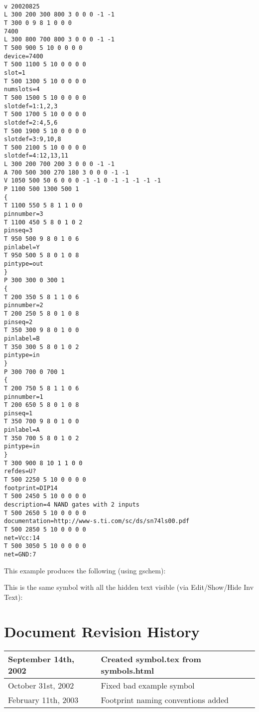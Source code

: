 \documentclass{article}
\begin{document}
\begin{verbatim}

v 20020825
L 300 200 300 800 3 0 0 0 -1 -1
T 300 0 9 8 1 0 0 0
7400
L 300 800 700 800 3 0 0 0 -1 -1
T 500 900 5 10 0 0 0 0
device=7400
T 500 1100 5 10 0 0 0 0
slot=1
T 500 1300 5 10 0 0 0 0
numslots=4
T 500 1500 5 10 0 0 0 0
slotdef=1:1,2,3
T 500 1700 5 10 0 0 0 0
slotdef=2:4,5,6
T 500 1900 5 10 0 0 0 0
slotdef=3:9,10,8
T 500 2100 5 10 0 0 0 0
slotdef=4:12,13,11
L 300 200 700 200 3 0 0 0 -1 -1
A 700 500 300 270 180 3 0 0 0 -1 -1
V 1050 500 50 6 0 0 0 -1 -1 0 -1 -1 -1 -1 -1
P 1100 500 1300 500 1
{
T 1100 550 5 8 1 1 0 0
pinnumber=3
T 1100 450 5 8 0 1 0 2
pinseq=3
T 950 500 9 8 0 1 0 6
pinlabel=Y
T 950 500 5 8 0 1 0 8
pintype=out
}
P 300 300 0 300 1
{
T 200 350 5 8 1 1 0 6
pinnumber=2
T 200 250 5 8 0 1 0 8
pinseq=2
T 350 300 9 8 0 1 0 0
pinlabel=B
T 350 300 5 8 0 1 0 2
pintype=in
}
P 300 700 0 700 1
{
T 200 750 5 8 1 1 0 6
pinnumber=1
T 200 650 5 8 0 1 0 8
pinseq=1
T 350 700 9 8 0 1 0 0
pinlabel=A
T 350 700 5 8 0 1 0 2
pintype=in
}
T 300 900 8 10 1 1 0 0
refdes=U?
T 500 2250 5 10 0 0 0 0
footprint=DIP14
T 500 2450 5 10 0 0 0 0
description=4 NAND gates with 2 inputs
T 500 2650 5 10 0 0 0 0
documentation=http://www-s.ti.com/sc/ds/sn74ls00.pdf
T 500 2850 5 10 0 0 0 0
net=Vcc:14
T 500 3050 5 10 0 0 0 0
net=GND:7
\end{verbatim}

This example produces the following (using gschem): 
\vspace{.125 in}

\begin{center}
\end{center}

This is the same symbol with all the hidden text visible (via 
Edit/Show/Hide Inv Text):

\begin{center}
\end{center}

\newpage
\section{Document Revision History}

\begin{table}[h]
\begin{tabular}{|l|l|} \hline
September 14th, 2002 & Created symbol.tex from symbols.html \\ \hline
October 31st, 2002 & Fixed bad example symbol \\ \hline
February 11th, 2003 & Footprint naming conventions added \\ \hline

\end{tabular}
\end{table}
\end{document}
